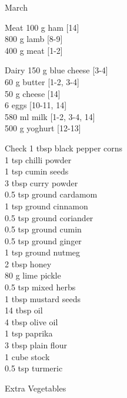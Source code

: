 \begin{menu}{March}
\begin{shoppinglist}{Meat}
      100 g ham {\scriptsize[14]}\\
      800 g lamb {\scriptsize[8-9]}\\
      400 g meat {\scriptsize[1-2]}\\
      \end{shoppinglist}%
      \begin{shoppinglist}{Dairy}
      150 g blue cheese {\scriptsize[3-4]}\\
      60 g butter {\scriptsize[1-2, 3-4]}\\
      50 g cheese {\scriptsize[14]}\\
      6  eggs {\scriptsize[10-11, 14]}\\
      580 ml milk {\scriptsize[1-2, 3-4, 14]}\\
      500 g yoghurt {\scriptsize[12-13]}\\
      \end{shoppinglist}%
      \par\vfil %
      \vfil\clearpage %
      \begin{shoppinglist}{Check}
      1 tbsp black pepper corns \\
      1 tsp chilli powder \\
      1 tsp cumin seeds \\
      3 tbsp curry powder \\
      0.5 tsp ground cardamom \\
      1 tsp ground cinnamon \\
      0.5 tsp ground coriander \\
      0.5 tsp ground cumin \\
      0.5 tsp ground ginger \\
      1 tsp ground nutmeg \\
      2 tbsp honey \\
      80 g lime pickle \\
      0.5 tsp mixed herbs \\
      1 tbsp mustard seeds \\
      14 tbsp oil \\
      4 tbsp olive oil \\
      1 tsp paprika \\
      3 tbsp plain flour \\
      1 cube stock \\
      0.5 tsp turmeric \\
      \end{shoppinglist}%
      \begin{shoppinglist}{Extra Vegetables}

\end{shoppinglist}
\end{menu}
